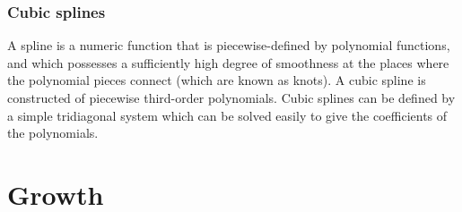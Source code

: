 \documentclass{beamer}
\begin{document}
\begin{frame}
\frametitle{Cubic splines}
A spline is a numeric function that is piecewise-defined by polynomial
functions, and which possesses a sufficiently high degree of smoothness at the
places where the polynomial pieces connect (which are known as knots). A cubic
spline is constructed of piecewise third-order polynomials.  Cubic splines can
be defined by a simple tridiagonal system which can be solved easily to give the
coefficients of the polynomials.
\end{frame}


\section{Growth}

\end{document}
